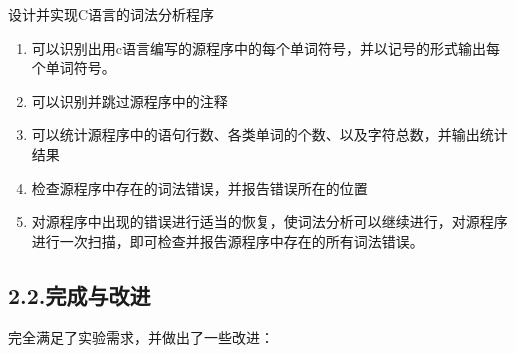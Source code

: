 \documentclass{article}
\begin{document}
\noindent{}设计并实现C语言的词法分析程序%

\begin{enumerate}[noitemsep,topsep=\mdcompacttopsep]%

\item{}可以识别出用c语言编写的源程序中的每个单词符号，并以记号的形式输出每个单词符号。%

\item{}可以识别并跳过源程序中的注释%

\item{}可以统计源程序中的语句行数、各类单词的个数、以及字符总数，并输出统计结果%

\item{}检查源程序中存在的词法错误，并报告错误所在的位置%

\item{}对源程序中出现的错误进行适当的恢复，使词法分析可以继续进行，对源程序进行一次扫描，即可检查并报告源程序中存在的所有词法错误。%
\end{enumerate}%

\subsection{2.2.\hspace*{0.5em}完成与改进}\label{section}%

\noindent{}完全满足了实验需求，并做出了一些改进：%
\end{document}
